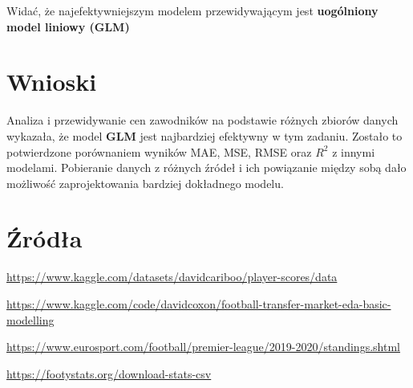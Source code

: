 \documentclass{article}
\begin{document}
Widać, że najefektywniejszym modelem przewidywającym jest \textbf{uogólniony model liniowy (GLM)}

\section{Wnioski}
Analiza i przewidywanie cen zawodników na podstawie różnych zbiorów danych wykazała, że model \textbf{GLM} jest najbardziej efektywny w tym zadaniu. Zostało to potwierdzone porównaniem wyników MAE, MSE, RMSE oraz \( R^2 \)
  z innymi modelami. Pobieranie danych z różnych źródeł i ich powiązanie między sobą dało możliwość zaprojektowania bardziej dokładnego modelu.
\section{Źródła}
\begin{flushleft}
    \href{https://www.kaggle.com/datasets/davidcariboo/player-scores/data}{https://www.kaggle.com/datasets/davidcariboo/player-scores/data}

    \href{https://www.kaggle.com/code/davidcoxon/football-transfer-market-eda-basic-modelling}{https://www.kaggle.com/code/davidcoxon/football-transfer-market-eda-basic-modelling}

    \href{https://www.eurosport.com/football/premier-league/2019-2020/standings.shtml}{https://www.eurosport.com/football/premier-league/2019-2020/standings.shtml}

    \href{https://footystats.org/download-stats-csv}{https://footystats.org/download-stats-csv}
\end{flushleft}

  
\end{document}
